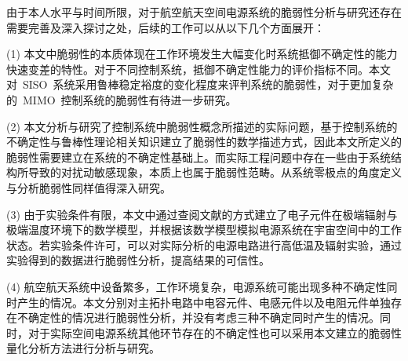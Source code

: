 由于本人水平与时间所限，对于航空航天空间电源系统的脆弱性分析与研究还存在需要完善及深入探讨之处，后续的工作可以从以下几个方面展开：

(1)  本文中脆弱性的本质体现在工作环境发生大幅变化时系统抵御不确定性的能力快速变差的特性。对于不同控制系统，抵御不确定性能力的评价指标不同。本文对~SISO~系统采用鲁棒稳定裕度的变化程度来评判系统的脆弱性，对于更加复杂的~MIMO~控制系统的脆弱性有待进一步研究。

(2) 本文分析与研究了控制系统中脆弱性概念所描述的实际问题，基于控制系统的不确定性与鲁棒性理论相关知识建立了脆弱性的数学描述方式，因此本文所定义的脆弱性需要建立在系统的不确定性基础上。而实际工程问题中存在一些由于系统结构所导致的对扰动敏感现象，本质上也属于脆弱性范畴。从系统零极点的角度定义与分析脆弱性同样值得深入研究。

(3)  由于实验条件有限，本文中通过查阅文献的方式建立了电子元件在极端辐射与极端温度环境下的数学模型，并根据该数学模型模拟电源系统在宇宙空间中的工作状态。若实验条件许可，可以对实际分析的电源电路进行高低温及辐射实验，通过实验得到的数据进行脆弱性分析，提高结果的可信性。

(4) 航空航天系统中设备繁多，工作环境复杂，电源系统可能出现多种不确定性同时产生的情况。本文分别对主拓扑电路中电容元件、电感元件以及电阻元件单独存在不确定性的情况进行脆弱性分析，并没有考虑三种不确定同时产生的情况。同时，对于实际空间电源系统其他环节存在的不确定性也可以采用本文建立的脆弱性量化分析方法进行分析与研究。